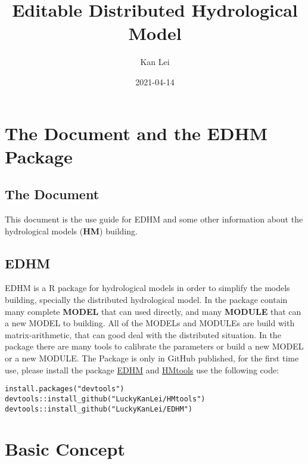 \documentclass[
]{book}
\title{Editable Distributed Hydrological Model}
\author{Kan Lei}
\date{2021-04-14}
\begin{document}
\maketitle

{
\setcounter{tocdepth}{1}
\tableofcontents
}
\hypertarget{the-document-and-the-edhm-package}{%
\chapter*{The Document and the EDHM Package}\label{the-document-and-the-edhm-package}}

\hypertarget{the-document}{%
\section*{The Document}\label{the-document}}

This document is the use guide for EDHM and some other information about the hydrological models (\textbf{HM}) building.

\hypertarget{edhm}{%
\section*{EDHM}\label{edhm}}

EDHM is a R package for hydrological models in order to simplify the models building, specially the distributed hydrological model. In the package contain many complete \textbf{MODEL} that can used directly, and many \textbf{MODULE} that can a new MODEL to building. All of the MODELs and MODULEs are build with matrix-arithmetic, that can good deal with the distributed situation. In the package there are many tools to calibrate the parameters or build a new MODEL or a new MODULE. The Package is only in GitHub published, for the first time use, please install the package \href{https://github.com/LuckyKanLei/EDHM}{EDHM} and \href{https://github.com/LuckyKanLei/HMtools}{HMtools} use the following code:

\begin{verbatim}
install.packages("devtools")
devtools::install_github("LuckyKanLei/HMtools")
devtools::install_github("LuckyKanLei/EDHM")
\end{verbatim}

\hypertarget{base}{%
\chapter{Basic Concept}\label{base}}
\end{document}
